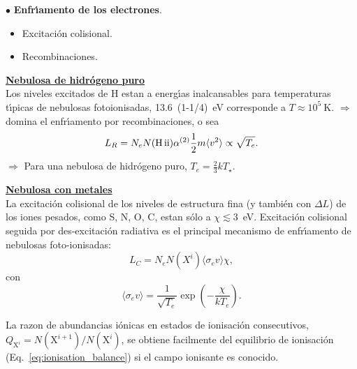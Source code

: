 
$\bullet$ {\bf \large Enfr\'{\i}amento de los  electrones}.

\begin{itemize}
\item Excitaci\'on colisional.
\item Recombinaciones.
\end{itemize}

\underline{\bf Nebulosa de hidr\'ogeno puro}\\

Los niveles excitados de H estan a energ\'{\i}as inalcansables para
temperaturas t\'{\i}picas de nebulosas fotoionisadas, 13.6~(1-1/4)~eV
corresponde a $T\approx 10^5~$K. $\Rightarrow$ domina el
enfr\'{\i}amento por recombinaciones, o sea \[ L_R = N_e N(\mathrm{H\,{\sc
ii}}) \alpha^{(2)} \frac{1}{2} m \langle v^2 \rangle \propto
\sqrt{T_e}.
\]
$\Rightarrow$ Para una nebulosa de hidr\'ogeno puro, $T_e = \frac{2}{3}
k T_\star$. 




\underline{\bf Nebulosa con metales}\\

La excitaci\'on colisional de los niveles de estructura fina (y
tambi\'en con $\Delta L$) de los iones pesados, como S, N, O, C, estan
s\'olo a $\chi \lesssim 3$~eV. Excitaci\'on colisional seguida por
des-excitaci\'on radiativa es el principal mecanismo de
enfr\'{\i}amento de nebulosas foto-ionisadas:
\[
L_C = N_e N(X^i) \langle \sigma_e v \rangle  \chi, 
\]
con
\[
\langle \sigma_e v \rangle  =  \frac{1}{\sqrt{T_e}} \exp( - \frac{\chi}{kT_e}). 
\]




La razon de abundancias i\'onicas en estados de ionisaci\'on
consecutivos,
$Q_{\mathrm{X}^{i}}=N(\mathrm{X}^{i+1})/N(\mathrm{X}^{i})$, se obtiene
facilmente del equilibrio de ionisaci\'on
(Eq.~\ref{eq:ionisation_balance}) si el campo ionisante es conocido. 
  


